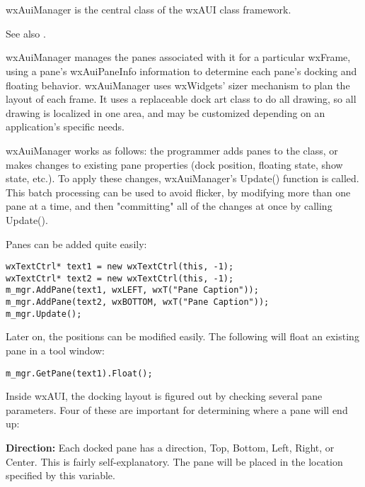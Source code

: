 \section{}\label{wxauimanager}

wxAuiManager is the central class of the wxAUI class framework.

See also .

wxAuiManager manages the panes associated with it
for a particular wxFrame, using a pane's wxAuiPaneInfo information to
determine each pane's docking and floating behavior. wxAuiManager
uses wxWidgets' sizer mechanism to plan the layout of each frame. It
uses a replaceable dock art class to do all drawing, so all drawing is
localized in one area, and may be customized depending on an
application's specific needs.

wxAuiManager works as follows: the programmer adds panes to the class,
or makes changes to existing pane properties (dock position, floating
state, show state, etc.). To apply these changes, wxAuiManager's
Update() function is called. This batch processing can be used to avoid
flicker, by modifying more than one pane at a time, and then "committing"
all of the changes at once by calling Update().

Panes can be added quite easily:

\begin{verbatim}
wxTextCtrl* text1 = new wxTextCtrl(this, -1);
wxTextCtrl* text2 = new wxTextCtrl(this, -1);
m_mgr.AddPane(text1, wxLEFT, wxT("Pane Caption"));
m_mgr.AddPane(text2, wxBOTTOM, wxT("Pane Caption"));
m_mgr.Update();
\end{verbatim}

Later on, the positions can be modified easily. The following will float
an existing pane in a tool window:

\begin{verbatim}
m_mgr.GetPane(text1).Float();
\end{verbatim}


Inside wxAUI, the docking layout is figured out by checking several
pane parameters. Four of these are important for determining where a
pane will end up:

{\bf Direction:}
Each docked pane has a direction, Top, Bottom, Left, Right, or
Center. This is fairly self-explanatory. The pane will be placed in the
location specified by this variable.

